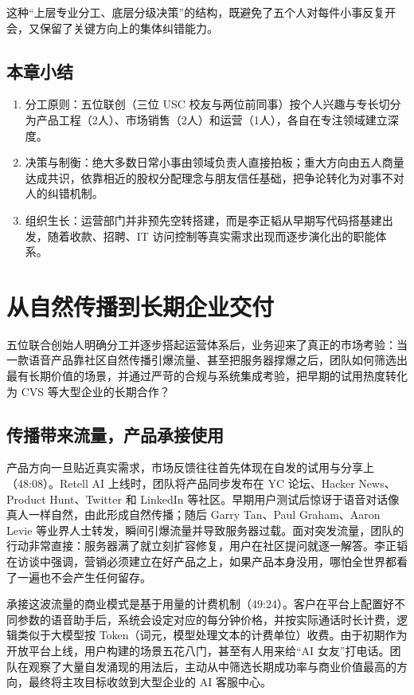 \documentclass[UTF8,a4paper,11pt,fontset=fandol]{ctexart}
\begin{document}
这种“上层专业分工、底层分级决策”的结构，既避免了五个人对每件小事反复开会，又保留了关键方向上的集体纠错能力。
\subsection{本章小结}
\begin{enumerate}
\item 分工原则：五位联创（三位 USC 校友与两位前同事）按个人兴趣与专长切分为产品工程（2人）、市场销售（2人）和运营（1人），各自在专注领域建立深度。
\item 决策与制衡：绝大多数日常小事由领域负责人直接拍板；重大方向由五人商量达成共识，依靠相近的股权分配理念与朋友信任基础，把争论转化为对事不对人的纠错机制。
\item 组织生长：运营部门并非预先空转搭建，而是李正韬从早期写代码搭基建出发，随着收款、招聘、IT 访问控制等真实需求出现而逐步演化出的职能体系。
\end{enumerate}
\section{从自然传播到长期企业交付}
五位联合创始人明确分工并逐步搭起运营体系后，业务迎来了真正的市场考验：当一款语音产品靠社区自然传播引爆流量、甚至把服务器撑爆之后，团队如何筛选出最有长期价值的场景，并通过严苛的合规与系统集成考验，把早期的试用热度转化为 CVS 等大型企业的长期合作？
\subsection{传播带来流量，产品承接使用}
产品方向一旦贴近真实需求，市场反馈往往首先体现在自发的试用与分享上（48:08）。Retell AI 上线时，团队将产品同步发布在 YC 论坛、Hacker News、Product Hunt、Twitter 和 LinkedIn 等社区。早期用户测试后惊讶于语音对话像真人一样自然，由此形成自然传播；随后 Garry Tan、Paul Graham、Aaron Levie 等业界人士转发，瞬间引爆流量并导致服务器过载。面对突发流量，团队的行动非常直接：服务器满了就立刻扩容修复，用户在社区提问就逐一解答。李正韬在访谈中强调，营销必须建立在好产品之上，如果产品本身没用，哪怕全世界都看了一遍也不会产生任何留存。

承接这波流量的商业模式是基于用量的计费机制（49:24）。客户在平台上配置好不同参数的语音助手后，系统会设定对应的每分钟价格，并按实际通话时长计费，逻辑类似于大模型按 Token（词元，模型处理文本的计费单位）收费。由于初期作为开放平台上线，用户构建的场景五花八门，甚至有人用来给“AI 女友”打电话。团队在观察了大量自发涌现的用法后，主动从中筛选长期成功率与商业价值最高的方向，最终将主攻目标收敛到大型企业的 AI 客服中心。
\end{document}
